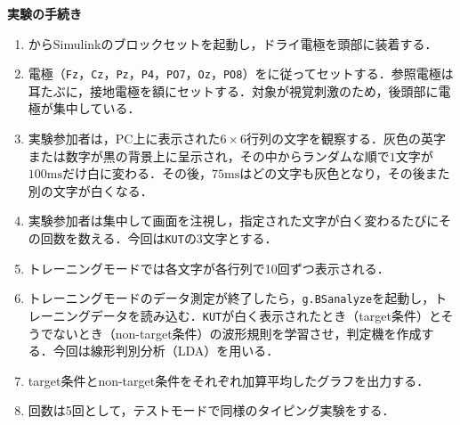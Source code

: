 \textbf{実験の手続き}
\begin{multicols}{2}
    \begin{enumerate}
        \item \matlab からSimulinkのブロックセットを起動し，ドライ電極を頭部に装着する\footnotemark[1]．
        \item 電極（\texttt{Fz}，\texttt{Cz}，\texttt{Pz}，\texttt{P4}，\texttt{PO7}，\texttt{Oz}，\texttt{PO8}）をに従ってセットする．参照電極は耳たぶに，接地電極を額にセットする．対象が視覚刺激のため，後頭部に電極が集中している．
        \item 実験参加者は，PC上に表示された\(6\times6\)行列の文字を観察する．灰色の英字または数字が黒の背景上に呈示され，その中からランダムな順で\(1\)文字が\(100\textrm{ms}\)だけ白に変わる．その後，\(75\textrm{ms}\)はどの文字も灰色となり，その後また別の文字が白くなる．
        \item 実験参加者は集中して画面を注視し，指定された文字が白く変わるたびにその回数を数える．今回は\texttt{KUT}の3文字とする．
              \columnbreak
        \item トレーニングモードでは各文字が各行列で10回ずつ表示される．
        \item トレーニングモードのデータ測定が終了したら，\texttt{g.BSanalyze}を起動し，トレーニングデータを読み込む．\texttt{KUT}が白く表示されたとき（target条件）とそうでないとき（non-target条件）の波形規則を学習させ，判定機を作成する．今回は線形判別分析（LDA）を用いる．
        \item target条件とnon-target条件をそれぞれ加算平均したグラフを出力する．
        \item {}回数は5回として，テストモードで同様のタイピング実験をする．
    \end{enumerate}
\end{multicols}

